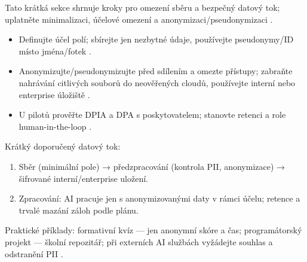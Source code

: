 Tato krátká sekce shrnuje kroky pro omezení sběru a bezpečný datový tok; uplatněte minimalizaci, účelové omezení a anonymizaci/pseudonymizaci \cite{kb_ai_101_tipu_pdf_04e4a115_page_8_1}.

\begin{itemize}
  \item Definujte účel polí; sbírejte jen nezbytné údaje, používejte pseudonymy/ID místo jména/fotek \cite{kb_ai_101_tipu_pdf_04e4a115_page_8_1}.
  \item Anonymizujte/pseudonymizujte před sdílením a omezte přístupy; zabraňte nahrávání citlivých souborů do neověřených cloudů, používejte interní nebo enterprise úložiště \cite{kb_ai_101_tipu_pdf_04e4a115_page_8_1,kb_ai_101_tipu_pdf_04e4a115_page_53_2}.
  \item U pilotů prověřte DPIA a DPA s poskytovatelem; stanovte retenci a role human-in-the-loop \cite{kb_malinka_chatgpt_ve_vyuce_dva_roky_pote_2024_pdf_90bc3aaf_page_12_1}.
\end{itemize}

Krátký doporučený datový tok:
\begin{enumerate}
  \item Sběr (minimální pole) → předzpracování (kontrola PII, anonymizace) → šifrované interní/enterprise uložení.
  \item Zpracování: AI pracuje jen s anonymizovanými daty v rámci účelu; retence a trvalé mazání záloh podle plánu.
\end{enumerate}

Praktické příklady: formativní kvíz — jen anonymní skóre a čas; programátorský projekt — školní repozitář; při externích AI službách vyžádejte souhlas a odstranění PII \cite{kb_ai_101_tipu_pdf_04e4a115_page_53_2}.
